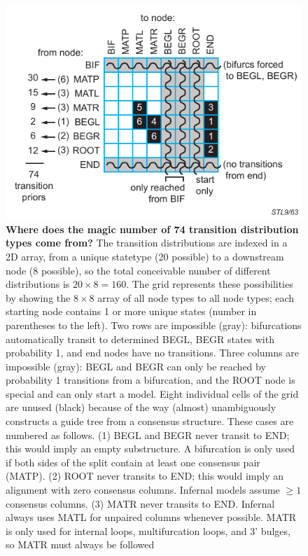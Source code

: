 \begin{figure}[htp]
\begin{center}
\includegraphics{Figures/stl9-63}
\end{center}
\caption{\small\textbf{Where does the magic number of 74 transition
distribution types come from?} The transition distributions are
indexed in a 2D array, from a unique statetype (20 possible) to a
downstream node (8 possible), so the total conceivable number of
different distributions is $20 \times 8 = 160$. The grid represents
these possibilities by showing the $8 \times 8$ array of all node
types to all node types; each starting node contains 1 or more unique
states (number in parentheses to the left).
Two rows are impossible (gray): bifurcations automatically transit to
determined BEGL, BEGR states with probability 1, and end nodes have no
transitions.  Three columns are impossible (gray): BEGL and BEGR can
only be reached by probability 1 transitions from a bifurcation, and
the ROOT node is special and can only start a model. 
Eight individual cells of the grid are unused (black) because of the
way  (almost) unambiguously constructs a guide tree from
a consensus structure.  These cases are numbered as follows. (1) BEGL
and BEGR never transit to END; this would imply an empty
substructure. A bifurcation is only used if both sides of the split
contain at least one consensus pair (MATP). (2) ROOT never transits to
END; this would imply an alignment with zero consensus
columns. Infernal models assume $\geq 1$ consensus columns. (3) MATR
never transits to END. Infernal always uses MATL for unpaired columns
whenever possible. MATR is only used for internal loops,
multifurcation loops, and 3' bulges, so MATR must always be followed
}
\end{figure}
